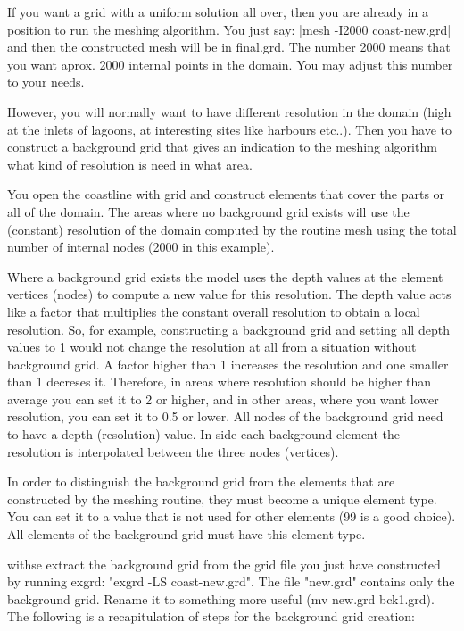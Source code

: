 If you want a grid with a uniform solution all over, then
you are already in a position to run the meshing algorithm.
You just say: |mesh -I2000 coast-new.grd| and then
the constructed mesh will be in final.grd. The number 2000
means that you want aprox. 2000 internal points in the domain.
You may adjust this number to your needs.

However, you will normally want to have different resolution
in the domain (high at the inlets of lagoons, at interesting
sites like harbours etc..). Then you have to construct a
background grid that gives an indication to the meshing
algorithm what kind of resolution is need in what area.

You open the coastline with grid and construct elements
that cover the parts or all of the domain. The areas where
no background grid exists will use the (constant) resolution of the
domain computed by the routine mesh using the total number of
internal nodes (2000 in this example).

Where a background grid exists the model uses the depth values at the
element vertices (nodes) to compute a new value for this resolution.
The depth value acts like a factor that multiplies the constant
overall resolution to obtain a local resolution. So, for example,
constructing a background grid and setting all depth values to 1
would not change the resolution at all from a situation without
background grid. A factor higher than 1 increases the resolution
and one smaller than 1 decreses it. Therefore, in areas where
resolution should be higher than average you can set it to
2 or higher, and in other areas, where you want lower resolution,
you can set it to 0.5 or lower. All nodes of the background grid
need to have a depth (resolution) value. In side each background
element the resolution is interpolated between the three nodes
(vertices).

In order to distinguish the background grid from the elements
that are constructed by the meshing routine, they must become
a unique element type. You can set it to a value that is not
used for other elements (99 is a good choice). All elements
of the background grid must have this element type.

withse extract the background grid from the grid file you just
have constructed by running exgrd: "exgrd -LS coast-new.grd".
The file "new.grd" contains only the background grid. Rename it to
something more useful (mv new.grd bck1.grd).
The following is a recapitulation of steps for the background grid creation:

